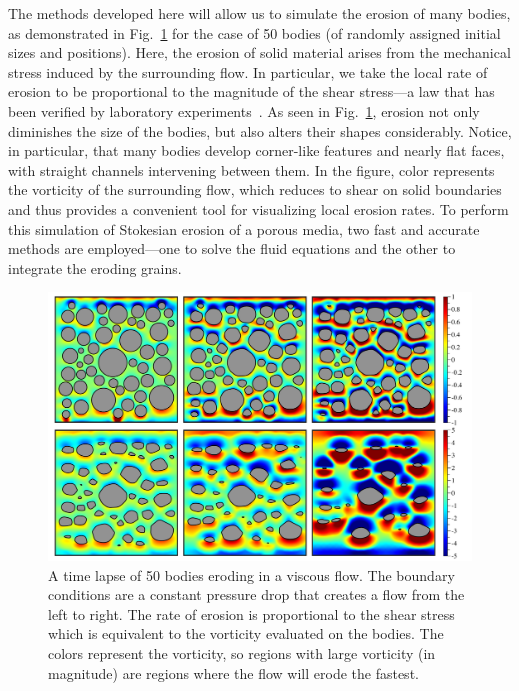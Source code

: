 \documentclass[preprint, 10pt]{elsarticle}
\begin{document}
The methods developed here will allow us to simulate the erosion of many
bodies, as demonstrated in Fig.~\ref{fig:50bodies} for the case of 50
bodies (of randomly assigned initial sizes and positions). Here, the
erosion of solid material arises from the mechanical stress induced by
the surrounding flow. In particular, we take the local rate of erosion
to be proportional to the magnitude of the shear stress---a law that has
been verified by laboratory experiments~\cite{ris-moo-chi-she-zha2012}.
As seen in Fig.~\ref{fig:50bodies}, erosion not only diminishes the size
of the bodies, but also alters their shapes considerably. Notice, in
particular, that many bodies develop corner-like features and nearly
flat faces, with straight channels intervening between them. In the
figure, color represents the vorticity of the surrounding flow, which
reduces to shear on solid boundaries and thus provides a convenient tool
for visualizing local erosion rates. To perform this simulation of
Stokesian erosion of a porous media, two fast and accurate methods are
employed---one to solve the fluid equations and the other to integrate
the eroding grains.  


\begin{figure}%
\begin{center}
\includegraphics[width = 0.80 \textwidth]{./figs/50bod.pdf}
\caption{\label{fig:50bodies} A time lapse of 50 bodies eroding in a viscous flow.  The boundary conditions are a constant pressure drop that creates a flow from the left to right.  The rate of erosion is proportional to the shear stress which is equivalent to the vorticity evaluated on the bodies.  The colors represent the vorticity, so regions with large vorticity (in magnitude) are regions where the flow will erode the fastest.}
\end{center}
\end{figure}
\end{document}
